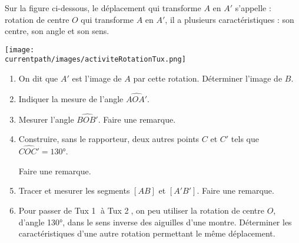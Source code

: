 \begin{activite}
    Sur la figure ci-dessous, le déplacement qui transforme $A$ en $A'$ s'appelle : rotation de centre $O$ qui transforme $A$ en $A'$, il a plusieurs caractéristiques : son centre, son angle et son sens.
    \begin{center}
        \texttt{[image: \\currentpath/images/activiteRotationTux.png]}
    \end{center}
    \begin{enumerate}
        \item On dit que $A'$ est l'image de $A$ par cette rotation. Déterminer l'image de $B$.
        \item Indiquer la mesure de l'angle $\widehat{AOA'}$.
        \item Mesurer l'angle $\widehat{BOB'}$. Faire une remarque.
        \item Construire, sans le rapporteur, deux autres points $C$ et $C'$ tels que $\widehat{COC'}=\ang{130}$.
        
        Faire une remarque.
        \item Tracer et mesurer les segments $[AB]$ et $[A'B']$. Faire une remarque.
        \item Pour passer de Tux \textcircled{1} à Tux \textcircled{2}, on peu utiliser la rotation de centre $O$, d'angle \ang{130}, dans le sens inverse des aiguilles d'une montre.
        Déterminer les caractéristiques d'une autre rotation permettant le même déplacement.
    \end{enumerate}

    \begin{myBox}{}
        \begin{minipage}{\linewidth}
        \end{minipage}
    
        \begin{minipage}{\linewidth}
        \end{minipage}
    \end{myBox}

\end{activite}